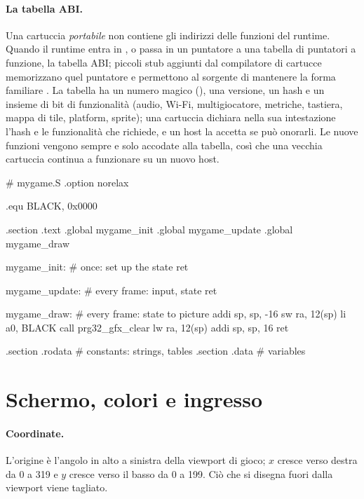 \paragraph{La tabella ABI.} Una cartuccia \emph{portabile} non contiene gli
indirizzi delle funzioni del runtime. Quando il runtime entra in ,
 o  passa in  un puntatore a una tabella di
puntatori a funzione, la tabella ABI; piccoli stub aggiunti dal compilatore di
cartucce memorizzano quel puntatore e permettono al sorgente di mantenere la
forma familiare . La tabella ha un numero magico
(), una versione, un hash e un insieme di bit di funzionalità
(audio, Wi-Fi, multigiocatore, metriche, tastiera, mappa di tile, platform,
sprite); una cartuccia dichiara nella sua intestazione l'hash e le
funzionalità che richiede, e un host la accetta se può onorarli. Le nuove
funzioni vengono sempre e solo accodate alla tabella, così che una vecchia
cartuccia continua a funzionare su un nuovo host.

\begin{asm}[caption={Lo scheletro di una cartuccia \prg in assembly.},label=lst:prg:skel]
# mygame.S
.option norelax

.equ BLACK, 0x0000

.section .text
.global mygame_init
.global mygame_update
.global mygame_draw

mygame_init:                # once: set up the state
    ret

mygame_update:              # every frame: input, state
    ret

mygame_draw:                # every frame: state to picture
    addi sp, sp, -16
    sw   ra, 12(sp)
    li   a0, BLACK
    call prg32_gfx_clear
    lw   ra, 12(sp)
    addi sp, sp, 16
    ret

.section .rodata            # constants: strings, tables
.section .data              # variables
\end{asm}

\section{Schermo, colori e ingresso}

\paragraph{Coordinate.} L'origine è l'angolo in alto a sinistra della viewport
di gioco; $x$ cresce verso destra da 0 a 319 e $y$ cresce verso il basso da 0
a 199. Ciò che si disegna fuori dalla viewport viene tagliato.

